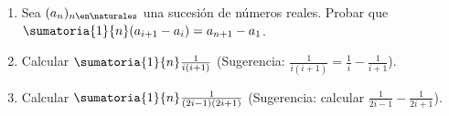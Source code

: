 \begin{enunciado}{\ejercicio}
  \begin{enumerate}[label=\roman*)]
    \item Sea $(a_n)_{n \en \naturales }$ una sucesión de números reales.
          Probar que $ \sumatoria{1}{n} (a_{i+1} - a_i) = a_{n+1} - a_1$.

    \item Calcular $ \sumatoria{1}{n} \frac{1}{i(i+1)}$ \quad (Sugerencia: $ \frac{1}{i(i+1)} = \frac{1}{i} - \frac{1}{i+1}$).

    \item Calcular $ \sumatoria{1}{n} \frac{1}{(2i-1)(2i+1)}$ \quad (Sugerencia: calcular $ \frac{1}{2i-1} - \frac{1}{2i+1}$).
  \end{enumerate}
\end{enunciado}

